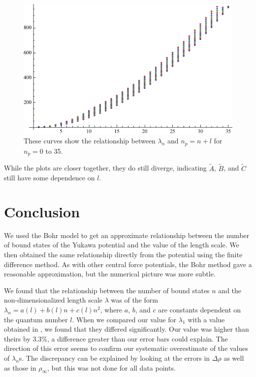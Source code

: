 \documentclass[12pt,twoside]{reedthesis}
\begin{document}
\begin{figure}[h]
\centering
\includegraphics{Figures/alllcs-principal}
\caption[Plots of $\lambda_n$ versus $n + l$ for $l = 0$ to $10$]{These curves show the relationship between $\lambda_n$ and $n_p = n + l$ for $n_p = 0$ to 35.}
\label{fig:alllcs-principal}
\end{figure}

While the plots are closer together, they do still diverge, indicating $\tilde{A}$, $\tilde{B}$, and $\tilde{C}$ still have some dependence on $l$.


%
%
\chapter*{Conclusion}
	\setcounter{chapter}{4}
	\setcounter{section}{0}

We used the Bohr model to get an approximate relationship between the number of bound states of the Yukawa potential and the value of the length scale. We then obtained the same relationship directly from the potential using the finite difference method. As with other central force potentials, the Bohr method gave a reasonable approximation, but the numerical picture was more subtle. 

We found that the relationship between the number of bound states $n$ and the non-dimensionalized length scale $\lambda$ was of the form $\lambda_n = a(l) + b(l)n + c(l)n^2$, where $a$, $b$, and $c$ are constants dependent on the quantum number $l$. When we compared our value for $\lambda_1$ with a value obtained in \cite{PhysRevA.50.228}, we found that they differed significantly. Our value was higher than theirs by 3.3\%, a difference greater than our error bars could explain. The direction of this error seems to confirm our systematic overestimate of the values of $\lambda_n$s. The discrepancy can be explained by looking at the errors in $\Delta \rho$ as well as those in $\rho_{\infty}$, but this was not done for all data points.
\end{document}
